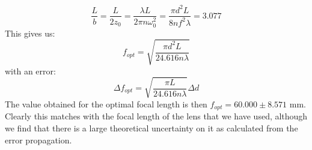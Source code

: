 \begin{itemize}
$$\dfrac{L}{b}=\dfrac{L}{2z_{0}}=\dfrac{\lambda L}{2\pi n \omega_{0}^{2}}=\dfrac{\pi d^{2} L}{8nf^{2}\lambda}=3.077
$$
This gives us: 
\begin{equation}
f_{opt}=\sqrt{\dfrac{\pi d^{2}L}{24.616n\lambda}}
\end{equation}
with an error: 
\begin{equation}
\Delta f_{opt}=\sqrt{\dfrac{\pi L}{24.616n\lambda}}\Delta d
\end{equation}
The value obtained for the optimal focal length is then $f_{opt}=60.000\pm 8.571$ mm. Clearly this matches with the focal length of the lens that we have used, although we find that there is a large theoretical uncertainty on it as calculated from the error propagation.
\end{itemize}